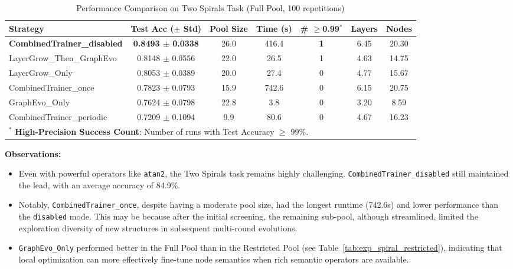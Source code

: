 \begin{table}[htbp]
\centering
\small %
\setlength{\tabcolsep}{3pt} %
\caption{Performance Comparison on Two Spirals Task (Full Pool, 100 repetitions)}
\label{tab:exp_spiral_full}
\begin{tabular}{l c c c c c c}
\toprule
\textbf{Strategy} & \textbf{Test Acc ($\pm$ Std)} & \textbf{Pool Size} & \textbf{Time (s)} & \textbf{\# $\geq$0.99$^*$} & \textbf{Layers} & \textbf{Nodes} \\
\midrule
\textbf{CombinedTrainer\_disabled} & \textbf{0.8493 $\pm$ 0.0338} & 26.0 & 416.4 & \textbf{1} & 6.45 & 20.30 \\
LayerGrow\_Then\_GraphEvo & 0.8148 $\pm$ 0.0556 & 22.0 & 26.5 & 1 & 4.63 & 14.75 \\
LayerGrow\_Only & 0.8053 $\pm$ 0.0389 & 20.0 & 27.4 & 0 & 4.77 & 15.67 \\
CombinedTrainer\_once & 0.7823 $\pm$ 0.0793 & 15.9 & 742.6 & 0 & 6.15 & 20.75 \\
GraphEvo\_Only & 0.7624 $\pm$ 0.0798 & 22.8 & 3.8 & 0 & 3.20 & 8.59 \\
CombinedTrainer\_periodic & 0.7209 $\pm$ 0.1094 & 9.9 & 80.6 & 0 & 4.67 & 16.23 \\
\bottomrule
\multicolumn{7}{l}{\footnotesize $^*$ \textbf{High-Precision Success Count}: Number of runs with Test Accuracy $\geq$ 99\%.}
\end{tabular}
\end{table}

\textbf{Observations:}
\begin{itemize}
    \item Even with powerful operators like \texttt{atan2}, the Two Spirals task remains highly challenging. \texttt{CombinedTrainer\_disabled} still maintained the lead, with an average accuracy of 84.9\%.
    \item Notably, \texttt{CombinedTrainer\_once}, despite having a moderate pool size, had the longest runtime (742.6s) and lower performance than the \texttt{disabled} mode. This may be because after the initial screening, the remaining sub-pool, although streamlined, limited the exploration diversity of new structures in subsequent multi-round evolutions.
    \item \texttt{GraphEvo\_Only} performed better in the Full Pool than in the Restricted Pool (see Table~\ref{tab:exp_spiral_restricted}), indicating that local optimization can more effectively fine-tune node semantics when rich semantic operators are available.
\end{itemize}

